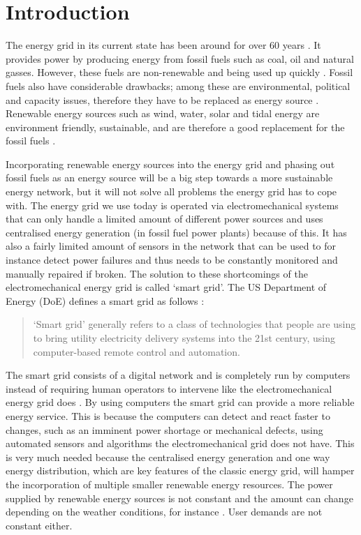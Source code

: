 \section{Introduction}\label{intro}
The energy grid in its current state has been around for over 60 years . It provides power by producing energy from fossil fuels such as coal, oil and natural gasses. However, these fuels are non-renewable and being used up quickly . Fossil fuels also have considerable drawbacks; among these are environmental, political and capacity issues, therefore they have to be replaced as energy source \cite{friedman2008hot}. Renewable energy sources such as wind, water, solar and tidal energy are environment friendly, sustainable, and are therefore a good replacement for the fossil fuels \cite{Tromly2001}.

Incorporating renewable energy sources into the energy grid and phasing out fossil fuels as an energy source will be a big step towards a more sustainable energy network, but it will not solve all problems the energy grid has to cope with. The energy grid we use today is operated via electromechanical systems that can only handle a limited amount of different power sources and uses centralised energy generation  (in fossil fuel power plants) because of this. It has also a fairly limited amount of sensors in the network that can be used to for instance detect power failures and thus needs to be constantly monitored and manually repaired  if broken. The solution to these shortcomings of the electromechanical energy grid is called `smart grid'. The US Department of Energy (DoE) defines a smart grid as follows \cite{doe}: 
 
\begin{quote}
`Smart grid' generally refers to a class of technologies that people are using to bring utility electricity delivery systems into the 21st century, using computer-based remote control and automation.
\end{quote}

The smart grid consists of a digital network and is completely run by computers instead of requiring human operators to intervene like the electromechanical energy grid does \cite{Moslehi2010}.  By using computers the smart grid can provide a more reliable energy service. This is because the computers can detect and react faster to changes, such as an imminent power shortage or mechanical defects, using automated sensors and algorithms the electromechanical grid does not have.  This is very much needed because the centralised energy generation and one way energy distribution, which are key features of the classic energy grid, will hamper the incorporation of multiple smaller renewable energy resources. The power supplied by renewable energy sources is not constant and the amount can change depending on the weather conditions, for instance \cite{RamchurnVitelingumRogersJennings2014}. User demands are not constant either.

